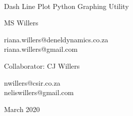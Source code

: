 %
%
\thispagestyle{empty}

{%
\sffamily
\centering
\Large

~\vspace{\fill}

{\huge
Dash Line Plot Python Graphing Utility
}

\vspace{2.5cm}

{\LARGE
MS Willers
}
\vspace{0.5cm}

riana.willers@deneldynamics.co.za\\
riana.willers@gmail.com

\vspace{3.5cm}

Collaborator: CJ Willers
\vspace{0.5cm}

nwillers@csir.co.za\\
neliswillers@gmail.com

\vspace{3.5cm}

\vspace{\fill}

March 2020

}%

\clearpage

\tableofcontents*

\clearpage

\listoffigures*

